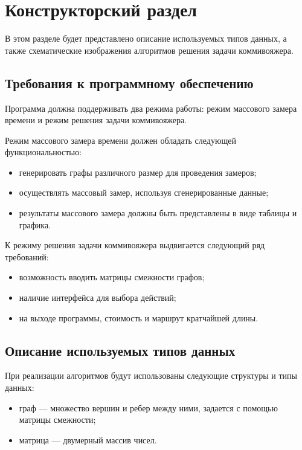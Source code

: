 \chapter{Конструкторский раздел}

В этом разделе будет представлено описание используемых типов данных, а также схематические изображения алгоритмов решения задачи коммивояжера.

\section{Требования к программному обеспечению}

Программа должна поддерживать два режима работы: режим массового замера времени и режим решения задачи коммивояжера.

Режим массового замера времени должен обладать следующей функциональностью:
\begin{itemize}
	\item генерировать графы различного размер для проведения замеров;
	\item осуществлять массовый замер, используя сгенерированные данные;
	\item результаты массового замера должны быть представлены в виде таблицы и графика.
\end{itemize}

К режиму решения задачи коммивояжера выдвигается следующий ряд требований:
\begin{itemize}
	\item возможность вводить матрицы смежности графов;
	\item наличие интерфейса для выбора действий;
	\item на выходе программы, стоимость и маршрут кратчайшей длины.
\end{itemize}

\section{Описание используемых типов данных}

При реализации алгоритмов будут использованы следующие структуры и типы данных:
\begin{itemize}
	\item граф --- множество вершин и ребер между ними, задается с помощью матрицы смежности;
	\item матрица --- двумерный массив чисел.
\end{itemize}

